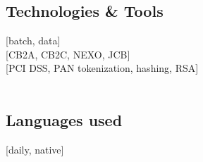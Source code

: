 {    \subsection{Technologies \& Tools}
     [batch, data]  \\
    [CB2A, CB2C, NEXO, JCB]\\
    [PCI DSS, PAN tokenization, hashing, RSA]\\
       \\
     

    \subsection{Languages used}
    [daily, native]
}
\makebody
\clearpage